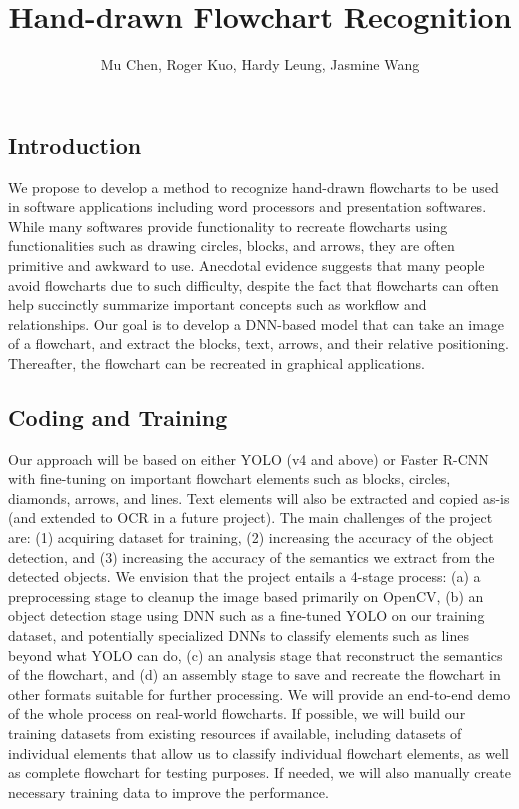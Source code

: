 \documentclass[10pt]{article}
\begin{document}
\thispagestyle{empty}

\vspace{-2em}
\title{Hand-drawn Flowchart Recognition}
\date{}

\vspace{-2em}
\author{Mu Chen, Roger Kuo, Hardy Leung, Jasmine Wang}

\maketitle

\vspace{-2em}
\subsection*{Introduction}

We propose to develop a method to recognize hand-drawn flowcharts to be
used in software applications including word processors and presentation softwares.
While many softwares provide functionality to recreate flowcharts using
functionalities such as drawing circles, blocks, and arrows,
they are often primitive and awkward to use. Anecdotal evidence suggests that
many people avoid flowcharts due to such difficulty, despite the fact that
flowcharts can often help succinctly summarize important concepts such as workflow
and relationships. Our goal is to develop a DNN-based model that can take an image
of a flowchart, and extract the blocks, text, arrows, and their relative
positioning. Thereafter, the flowchart can be recreated in graphical applications.

\subsection*{Coding and Training}

Our approach will be based on either YOLO (v4 and above)
or Faster R-CNN with fine-tuning on important flowchart elements such as blocks,
circles, diamonds, arrows, and lines. Text elements will also be extracted
and copied as-is (and extended to OCR in a future project).
The main challenges of the project are: (1) acquiring dataset for training,
(2) increasing the accuracy of the object detection, and
(3) increasing the accuracy of the semantics we extract from the detected objects.
We envision that the project entails a 4-stage process:
(a) a preprocessing stage to cleanup the image based primarily on OpenCV,
(b) an object detection stage using DNN such as a fine-tuned YOLO on our
training dataset, and potentially specialized DNNs to classify elements such as
lines beyond what YOLO can do, (c) an analysis stage that reconstruct the semantics
of the flowchart,
and (d) an assembly stage to save and recreate the flowchart in other formats
suitable for further processing. We will provide an end-to-end demo
of the whole process on real-world flowcharts.
If possible, we will build our training datasets from existing resources if available,
including datasets of individual elements that allow us to classify
individual flowchart elements, as well as complete flowchart for testing purposes.
If needed, we will also manually create necessary training data to
improve the performance.
\end{document}
